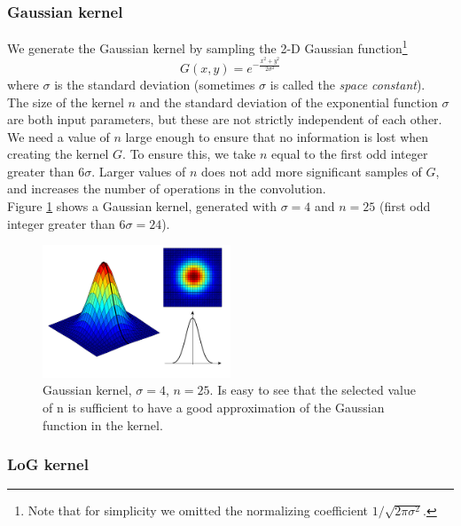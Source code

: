\documentclass{ipol}
\numberwithin{equation}{section}
\numberwithin{table}{section}
\numberwithin{figure}{section}
\begin{document}
\subsubsection{Gaussian kernel}

We generate the Gaussian kernel by sampling the 2-D Gaussian function\footnote{Note that for simplicity 
we omitted the normalizing coefficient $1/\sqrt{2\pi\sigma^2}$.}
\begin{equation}
	\label{eq:gaussian_function}
	G(x,y) = e^{-\frac{x^2+y^2}{2\sigma^2}}
\end{equation}
where $\sigma$ is the standard deviation (sometimes $\sigma$ is called the \textit{space constant}).\\

The size of the kernel $n$ and the standard deviation of the exponential function $\sigma$ are both 
input parameters, but these are not strictly independent of each other. We need a value 
of $n$ large enough to ensure that no information is lost when creating the kernel $G$. To ensure this, we take 
$n$ equal to the first odd integer greater than $6\sigma$. Larger values of $n$ does not add more 
significant samples ​​of $G$, and increases the number of operations in the convolution.\\

Figure \ref{fig:gaussian_kernel} shows a Gaussian kernel, generated with $\sigma = 4$ and $n = 25$ 
(first odd integer greater than $6\sigma=24$).\\

\begin{figure}
	\centering
	\includegraphics[width=0.5\textwidth]{kernel_gaussian.pdf}
	\caption{Gaussian kernel, $\sigma=4$, $n=25$. Is easy to see that the selected value of n is 
sufficient to have a good approximation of the Gaussian function in the kernel.}
	\label{fig:gaussian_kernel}
\end{figure}

\subsubsection{LoG kernel}
\end{document}
